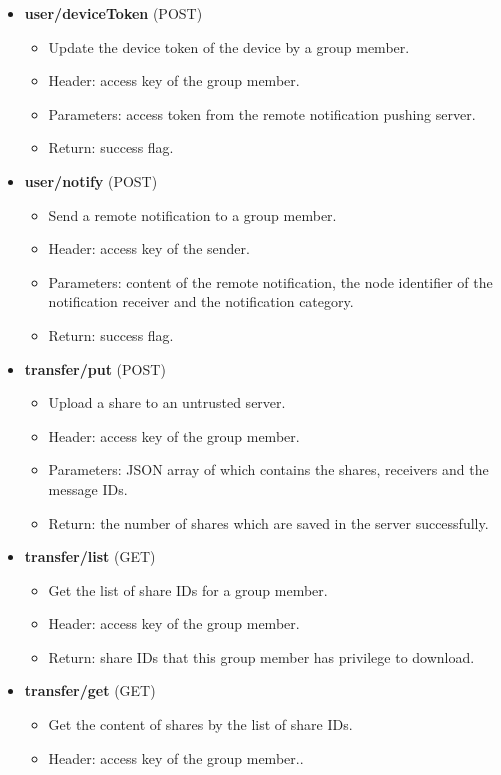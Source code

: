 \documentclass[a4paper,11pt]{report}
\begin{document}
\begin{itemize}[leftmargin=7mm]
\begin{itemize}
	\end{itemize}
	\item 
	\textbf{user/deviceToken} (POST)
	\begin{itemize}
		\item Update the device token of the device by a group member.
		\item Header: access key of the group member.
		\item Parameters: access token from the remote notification pushing server.
		\item Return: success flag.
	\end{itemize}
	\item 
	\textbf{user/notify} (POST)
	\begin{itemize}
		\item Send a remote notification to a group member.
		\item Header: access key of the sender.
		\item Parameters: content of the remote notification, the node identifier of the notification receiver and the notification category.
		\item Return: success flag.
	\end{itemize}
	\item 
	\textbf{transfer/put} (POST)
	\begin{itemize}
		\item Upload a share to an untrusted server.
		\item Header: access key of the group member.
		\item Parameters: JSON array of which contains the shares, receivers and the message IDs.
		\item Return: the number of shares which are saved in the server successfully.
	\end{itemize}
	\item 
	\textbf{transfer/list} (GET)
	\begin{itemize}
		\item Get the list of share IDs for a group member.
		\item Header: access key of the group member.
		\item Return: share IDs that this group member has privilege to download.
	\end{itemize}
	\item 
	\textbf{transfer/get} (GET)
	\begin{itemize}
		\item Get the content of shares by the list of share IDs.
		\item Header: access key of the group member..

\end{itemize}
\end{itemize}
\end{document}
